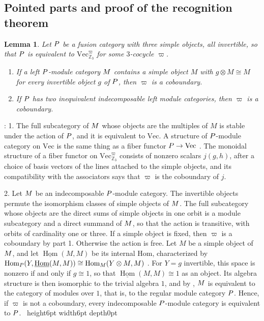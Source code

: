 \documentclass[leqno]{article}
\let\cal\relax
\newcommand{\cal}{\mathcal}
\newcommand{\Z}{\ensuremath{\mathbb{Z}}}
\newcommand{\qed}{\hfill \vrule height6pt  width6pt depth0pt}
\newcommand{\ot}{\otimes}
\newtheorem{lemma}[thm]{Lemma}
\newenvironment{proof}[1][]{\noindent {\it Proof #1} : }{\hbox{~}\qed
\smallskip
}
\numberwithin{equation}{section}
\begin{document}
\subsection{Pointed parts and proof of the recognition theorem}
\label{subsec:recognition-proof}

\begin{lemma}
\label{lem:pointed-trivial}
Let $\cal P$ be a fusion category with three simple objects, all invertible, so that $\cal P$ is equivalent to $\mathrm{Vec}^\varpi_{\Z_3}$ for some $3$-cocycle $\varpi$.
\begin{enumerate}
\item If a left $\cal P$-module category $\cal M$ contains a simple object $M$ with $g \ot M \cong M$ for every invertible object $g$ of $\cal P$, then $\varpi$ is a coboundary.
\item If $\cal P$ has two inequivalent indecomposable left module categories, then $\varpi$ is a coboundary.
\end{enumerate}
\end{lemma}

\begin{proof}
1. The full subcategory of $\cal M$ whose objects are the multiples of $M$ is stable under the action of $\cal P$, and it is equivalent to $\mathrm{Vec}$. A structure of $\cal P$-module category on $\mathrm{Vec}$ is the same thing as a fiber functor $\cal P \to \mathrm{Vec}$ \cite[Example (ii) pp.~6--7]{Ost03}. The monoidal structure of a fiber functor on $\mathrm{Vec}^\varpi_{\Z_3}$ consists of nonzero scalars $j(g,h)$, after a choice of basis vectors of the lines attached to the simple objects, and its compatibility with the associators says that $\varpi$ is the coboundary of $j$.

2. Let $\cal M$ be an indecomposable $\cal P$-module category. The invertible objects permute the isomorphism classes of simple objects of $\cal M$. The full subcategory whose objects are the direct sums of simple objects in one orbit is a module subcategory and a direct summand of $\cal M$, so that the action is transitive, with orbits of cardinality one or three. If a simple object is fixed, then $\varpi$ is a coboundary by part 1. Otherwise the action is free. Let $M$ be a simple object of $\cal M$, and let $\underline{\operatorname{Hom}}(M,M)$ be its internal Hom, characterized by $\operatorname{Hom}_{\cal P}(Y,\underline{\operatorname{Hom}}(M,M)) \cong \operatorname{Hom}_{\cal M}(Y \ot M,M)$ \cite[Definition 11 p.~9]{Ost03}. For $Y = g$ invertible, this space is nonzero if and only if $g \cong 1$, so that $\underline{\operatorname{Hom}}(M,M) \cong 1$ as an object. Its algebra structure is then isomorphic to the trivial algebra $1$, and by \cite[Theorem 1 and its proof pp.~10--11]{Ost03}, $\cal M$ is equivalent to the category of modules over $1$, that is, to the regular module category $\cal P$. Hence, if $\varpi$ is not a coboundary, every indecomposable $\cal P$-module category is equivalent to $\cal P$.
\end{proof}
\end{document}
